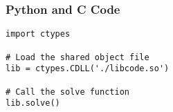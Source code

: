 \documentclass{beamer}
\begin{document}
\begin{frame}[fragile]
\frametitle{Python and C Code}

\begin{lstlisting}
import ctypes

# Load the shared object file
lib = ctypes.CDLL('./libcode.so')

# Call the solve function
lib.solve()
\end{lstlisting}

\end{frame}

 
\end{document}
